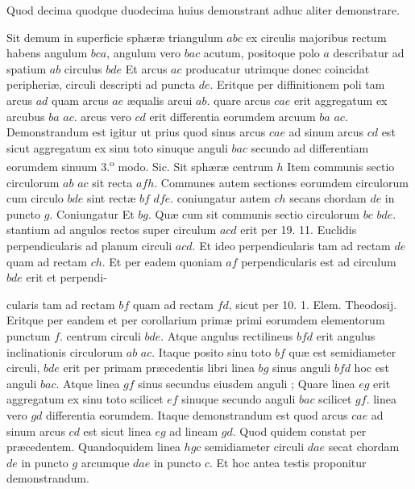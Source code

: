 \documentclass[11pt,a4paper]{article}
\begin{document}
Quod decima quodque duodecima huius demonstrant adhuc aliter demonstrare.

Sit demum in superficie sphæræ triangulum $abc$ ex circulis majoribus rectum habens angulum $bca$, angulum vero $bac$ acutum, positoque polo $a$ describatur ad spatium $ab$ circulus $bde$ Et arcus $ac$ producatur utrimque donec coincidat peripheriæ, circuli descripti ad puncta $de$. Eritque per diffinitionem poli tam arcus $ad$ quam arcus $ae$ æqualis arcui $ab$. quare arcus $cae$ erit aggregatum ex arcubus $ba$ $ac$. arcus vero $cd$ erit differentia eorumdem arcuum $ba$ $ac$. Demonstrandum est igitur ut prius quod sinus arcus $cae$ ad sinum arcus $cd$ est sicut aggregatum ex sinu toto sinuque anguli $bac$ secundo ad differentiam eorumdem sinuum 3.\textsuperscript{o} modo. Sic. Sit sphæræ centrum $h$ Item communis sectio circulorum $ab$ $ac$ sit recta $afh$. Communes autem sectiones eorumdem circulorum cum circulo $bde$ sint rectæ $bf$ $dfe$. coniungatur autem $ch$ secans chordam $de$ in puncto $g$. Coniungatur Et $bg$. Quæ cum sit communis sectio circulorum $bc$ $bde$. stantium ad angulos rectos super circulum $acd$ erit per 19. 11. Euclidis perpendicularis ad planum circuli $acd$. Et ideo perpendicularis tam ad rectam $de$ quam ad rectam $ch$. Et per eadem quoniam $af$ perpendicularis est ad circulum $bde$ erit et perpendi-

cularis tam ad rectam $bf$ quam ad rectam $fd$, sicut per 10. 1. Elem. Theodosij. Eritque per eandem et per corollarium primæ primi eorumdem elementorum punctum $f$. centrum circuli $bde$. Atque angulus rectilineus $bfd$ erit angulus inclinationis circulorum $ab$ $ac$. Itaque posito sinu toto $bf$ quæ est semidiameter circuli, $bde$ erit per primam præcedentis libri linea $bg$ sinus anguli $bfd$ hoc est anguli $bac$. Atque linea $gf$ sinus secundus eiusdem anguli ; Quare linea $eg$ erit aggregatum ex sinu toto scilicet $ef$ sinuque secundo anguli $bac$ scilicet $gf$. linea vero $gd$ differentia eorumdem. Itaque demonstrandum est quod arcus $cae$ ad sinum arcus $cd$ est sicut linea $eg$ ad lineam $gd$. Quod quidem constat per præcedentem. Quandoquidem linea $hgc$  semidiameter circuli $dae$ secat chordam $de$ in puncto $g$ arcumque $dae$ in puncto $c$. Et hoc  antea testis proponitur demonstrandum.
\end{document}
